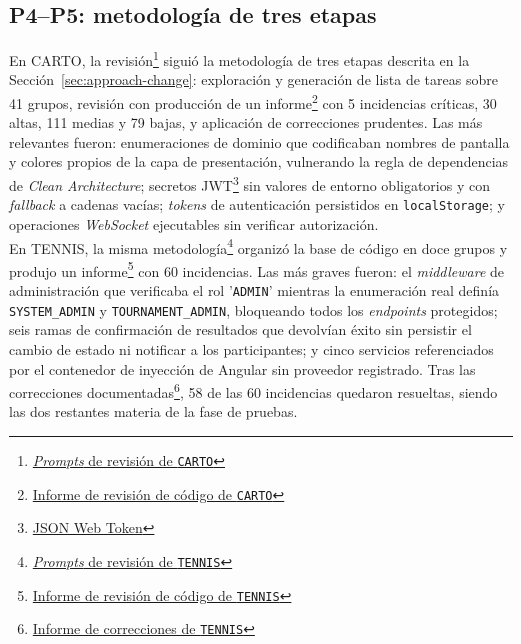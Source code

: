 \subsection{P4--P5: metodología de tres etapas}

En \ac{CARTO}, la revisión\footnote{\href{https://github.com/alu0101549491/TFG-Fabian-Gonzalez-Lence/tree/main/resources/prompts/4-CartographicProjectManager/4-RevisionDelCodigo}{\textit{Prompts} de revisión de \texttt{CARTO}}} siguió la metodología de tres etapas descrita en la Sección~\ref{sec:approach-change}: exploración y generación de lista de tareas sobre 41 grupos, revisión con producción de un informe\footnote{\href{https://github.com/alu0101549491/TFG-Fabian-Gonzalez-Lence/blob/main/projects/4-CartographicProjectManager/docs/review/reports/CODE_REVIEW_REPORT.md}{Informe de revisión de código de \texttt{CARTO}}} con 5 incidencias críticas, 30 altas, 111 medias y 79 bajas, y aplicación de correcciones prudentes. Las más relevantes fueron: enumeraciones de dominio que codificaban nombres de pantalla y colores propios de la capa de presentación, vulnerando la regla de dependencias de \textit{Clean Architecture}; secretos JWT\footnote{\href{https://es.wikipedia.org/wiki/JSON_Web_Token}{JSON Web Token}} sin valores de entorno obligatorios y con \textit{fallback} a cadenas vacías; \textit{tokens} de autenticación persistidos en \texttt{localStorage}; y operaciones \textit{WebSocket} ejecutables sin verificar autorización.\\

En \ac{TENNIS}, la misma metodología\footnote{\href{https://github.com/alu0101549491/TFG-Fabian-Gonzalez-Lence/tree/main/resources/prompts/5-TennisTournamentManager/4-RevisionDelCodigo}{\textit{Prompts} de revisión de \texttt{TENNIS}}} organizó la base de código en doce grupos y produjo un informe\footnote{\href{https://github.com/alu0101549491/TFG-Fabian-Gonzalez-Lence/blob/main/projects/5-TennisTournamentManager/docs/review_reports/TENNIS_review_report.md}{Informe de revisión de código de \texttt{TENNIS}}} con 60 incidencias. Las más graves fueron: el \textit{middleware} de administración que verificaba el rol '\texttt{ADMIN}' mientras la enumeración real definía \texttt{SYSTEM\_ADMIN} y \texttt{TOURNAMENT\_ADMIN}, bloqueando todos los \textit{endpoints} protegidos; seis ramas de confirmación de resultados que devolvían éxito sin persistir el cambio de estado ni notificar a los participantes; y cinco servicios referenciados por el contenedor de inyección de Angular sin proveedor registrado. Tras las correcciones documentadas\footnote{\href{https://github.com/alu0101549491/TFG-Fabian-Gonzalez-Lence/blob/main/projects/5-TennisTournamentManager/docs/review_reports/TENNIS_fix_report.md}{Informe de correcciones de \texttt{TENNIS}}}, 58 de las 60 incidencias quedaron resueltas, siendo las dos restantes materia de la fase de pruebas.

